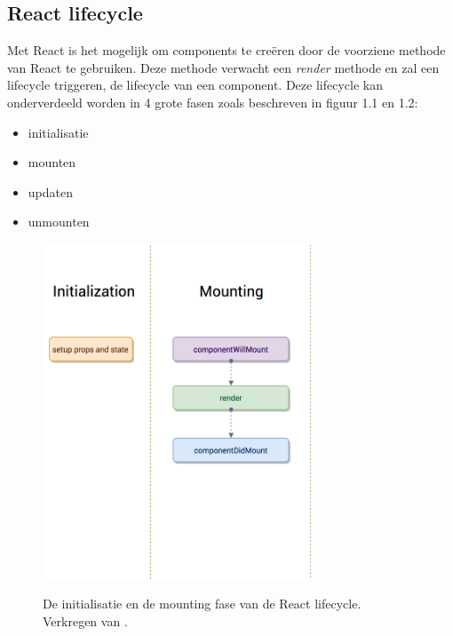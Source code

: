\subsection{React lifecycle}
Met React is het mogelijk om components te creëren door de voorziene methode van React te gebruiken. Deze methode verwacht een \textit{render} methode en zal een lifecycle triggeren, de lifecycle van een component. 
Deze lifecycle kan onderverdeeld worden in 4 grote fasen zoals beschreven in figuur 1.1 en 1.2:
\newline
\begin{itemize}
	\item initialisatie
	\item mounten
	\item updaten
	\item unmounten
\end{itemize}
\begin{figure}
	\begin{center}
		\caption{De initialisatie en de mounting fase van de React lifecycle. Verkregen van \textcite{reactlifecycle}.}
		\includegraphics[width=8cm]{img/react-lifecycle1}\\[0.5cm]
	\end{center}
\end{figure}


